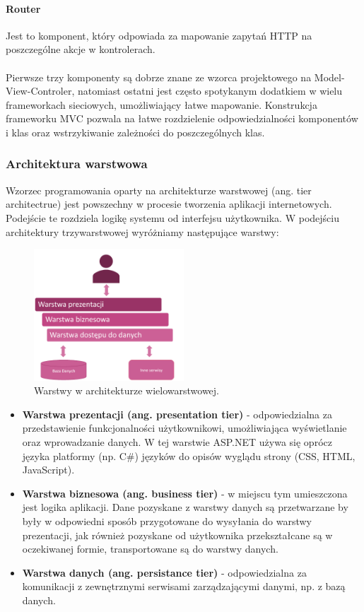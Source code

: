 \documentclass{article}
\begin{document}
\paragraph{Router}
Jest to komponent, który odpowiada za mapowanie zapytań HTTP na poszczególne akcje w kontrolerach.
\\\\
Pierwsze trzy komponenty są dobrze znane ze wzorca projektowego na Model-View-Controler, natomiast ostatni jest często spotykanym dodatkiem w wielu frameworkach sieciowych, umożliwiający łatwe mapowanie. Konstrukcja frameworku MVC pozwala na łatwe rozdzielenie odpowiedzialności komponentów i klas oraz wstrzykiwanie zależności do poszczególnych klas.

\subsubsection{Architektura warstwowa}

Wzorzec programowania oparty na architekturze warstwowej (ang. tier architectrue) jest powszechny w procesie tworzenia aplikacji internetowych. Podejście te rozdziela logikę systemu od interfejsu użytkownika. W podejściu architektury trzywarstwowej wyróżniamy następujące warstwy:

\begin{figure}[h]
\centering
	\includegraphics[width=0.50\textwidth]{ntier.png}
	\caption[caption]{Warstwy w architekturze wielowarstwowej.}
	\label{fig:tier}
\end{figure}

\begin{itemize}
\item \textbf{Warstwa prezentacji (ang. presentation tier)} - odpowiedzialna za przedstawienie funkcjonalności użytkownikowi, umożliwiająca wyświetlanie oraz wprowadzanie danych. W tej warstwie ASP.NET używa się oprócz języka platformy (np. C\#) języków do opisów wyglądu strony (CSS, HTML, JavaScript). 
\item \textbf{Warstwa biznesowa (ang. business tier)} - w miejscu tym umieszczona jest logika aplikacji. Dane pozyskane z warstwy danych są przetwarzane by były w odpowiedni sposób przygotowane do wysyłania do warstwy prezentacji, jak również pozyskane od użytkownika przekształcane są w oczekiwanej formie, transportowane są do warstwy danych.

\item \textbf{Warstwa danych (ang. persistance tier)} - odpowiedzialna za komunikacji z zewnętrznymi serwisami zarządzającymi danymi, np. z bazą danych.
\end{itemize}
\end{document}
